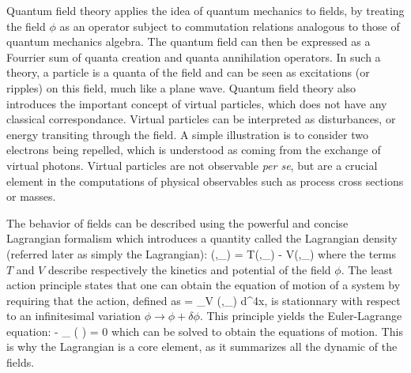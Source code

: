     Quantum field theory \cite{Polonyi, Ryder} applies the idea of quantum mechanics to fields, by treating the
    field $\phi$ as an operator subject to commutation relations analogous to those of
    quantum mechanics algebra. The quantum field can then be expressed as a Fourrier sum of quanta
    creation and quanta annihilation operators. In such a theory, a particle is a quanta
    of the field and can be seen as excitations (or ripples) on this field, much like a plane wave.
    Quantum field theory also introduces the important concept of virtual particles, which
    does not have any classical correspondance. Virtual particles can be interpreted as
    disturbances, or energy transiting through the field. A simple illustration is to
    consider two electrons being repelled, which is understood as coming from the
    exchange of virtual photons. Virtual particles are not observable \emph{per se}, but are a
    crucial element in the computations of physical observables such as process cross sections
    or masses.

    The behavior of fields can be described using the powerful and concise Lagrangian
    formalism which introduces a quantity called the Lagrangian density (referred later
    as simply the Lagrangian):
    {
        (\phi,\partial_\mu \phi)
        =
        T(\phi,\partial_\mu \phi) - V(\phi,\partial_\mu \phi)
    }
    where the terms $T$ and $V$ describe respectively the kinetics and potential of the
    field $\phi$. The least action principle states that one can obtain the equation of
    motion of a system by requiring that the action, defined as
    {
        =
        \int_V (\phi,\partial_\mu \phi) d^4x,
    }
    is stationnary with respect to an infinitesimal variation $\phi \rightarrow \phi +
    \delta\phi$. This principle yields the Euler-Lagrange equation:
    {
        -
        \partial_\mu
        \left(
        \right)
        =
        0
    }
    which can be solved to obtain the equations of motion. This is why the Lagrangian is
    a core element, as it summarizes all the dynamic of the fields.

